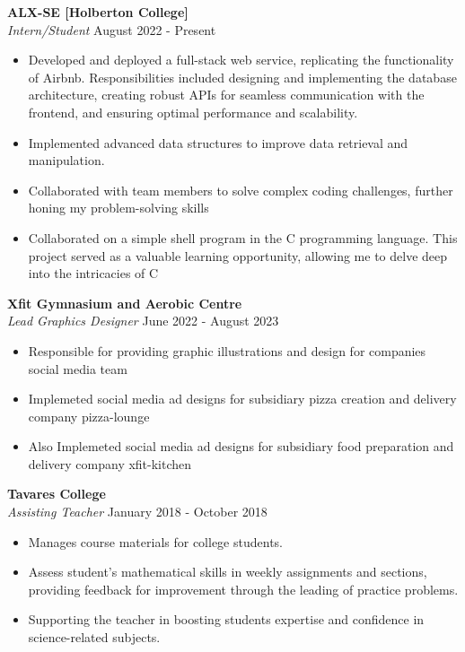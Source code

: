 \documentclass[a4paper]{article}
\begin{document}
\textbf{ALX-SE [Holberton College]}\\
\textit{Intern/Student} \hfill August 2022 - Present\\
\vspace{-1mm}
\begin{itemize} \itemsep 1pt
	\item Developed and deployed a full-stack web service, replicating the functionality of Airbnb. Responsibilities included designing and implementing the database architecture, creating robust APIs for seamless communication with the frontend, and ensuring optimal performance and scalability.
	\item Implemented advanced data structures to improve data retrieval and manipulation.
	\item Collaborated with team members to solve complex coding challenges, further honing my problem-solving skills
	\item Collaborated on a simple shell program in the C programming language. This project served as a valuable learning opportunity, allowing me to delve deep into the intricacies of C
\end{itemize}
\textbf{Xfit Gymnasium and Aerobic Centre}\\
\textit{Lead Graphics Designer} \hfill June 2022 - August 2023\\
\vspace{-1mm}
\begin{itemize} \itemsep 1pt
	\item Responsible for providing graphic illustrations and design for companies social media team
	\item Implemeted social media ad designs for subsidiary pizza creation and delivery company pizza-lounge
	\item Also Implemeted social media ad designs for subsidiary food preparation and delivery company xfit-kitchen
\end{itemize}
\textbf{Tavares College}\\
\textit{Assisting Teacher} \hfill January 2018 - October 2018\\
\vspace{-1mm}
\begin{itemize} \itemsep 1pt
	\item Manages course materials for college students.
	\item Assess student’s mathematical skills in weekly assignments and sections, providing feedback for improvement through the leading of practice problems.
	\item Supporting the teacher in boosting students\textquotesingle{} expertise and confidence in science-related subjects.
\end{itemize}
\end{document}

